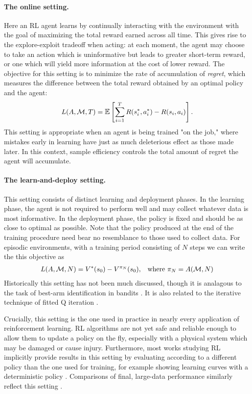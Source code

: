 \paragraph{The online setting.}
Here an RL agent learns by continually interacting with the environment with the goal of maximizing the total reward earned across all time.
This gives rise to the explore-exploit tradeoff when acting: at each moment, the agent may choose to take an action which is uninformative but leads to greater short-term reward, or one which will yield more information at the cost of lower reward.
The objective for this setting is to minimize the rate of accumulation of \emph{regret}, which measures the difference between the total reward obtained by an optimal policy and the agent:
\begin{align}
    L(A, \mdp, T) = \E \left[ \sum_{i=1}^T R(s^*_i, a^*_i) - R(s_i, a_i) \right].
\end{align}
This setting is appropriate when an agent is being trained "on the job," where mistakes early in learning have just as much deleterious effect as those made later.
In this context, sample efficiency controls the total amount of regret the agent will accumulate.

\paragraph{The learn-and-deploy setting.}
This setting consists of distinct learning and deployment phases.
In the learning phase, the agent is not required to perform well and may collect whatever data is most informative.
In the deployment phase, the policy is fixed and should be as close to optimal as possible.
Note that the policy produced at the end of the training procedure need bear no resemblance to those used to collect data.
For episodic environments, with a training period consisting of $N$ steps we can write the this objective as
\begin{align}
    L(A, \mathcal{M}, N) = V^*(s_0) - V^{\pi_N}(s_0), && \text{where } \pi_N = A(\mathcal{M}, N)
\end{align}
Historically this setting has not been much discussed, though it is analagous to the task of best-arm identification in bandits \citep{Russo2016SimpleBA,Kaufmann2016OnTC}.
It is also related to the iterative technique of fitted Q iteration \citep{Ernst2005TreeBasedBM,Riedmiller2005NeuralFQ}.

Crucially, this setting is the one used in practice in nearly every application of reinforcement learning.
RL algorithms are not yet safe and reliable enough to allow them to update a policy on the fly, especially with a physical system which may be damaged or cause injury.
Furthermore, most works studying RL implicitly provide results in this setting by evaluating according to a different policy than the one used for training, for example showing learning curves with a deterministic policy \citep{Mnih2015HumanlevelCT,Lillicrap2016ContinuousCW,Fujimoto2018AddressingFA,haarnoja2018soft}.
Comparisons of final, large-data performance similarly reflect this setting \citep{Silver2016MasteringTG,Vinyals2019GrandmasterLI,openai2019dota,OpenAI2019SolvingRC}.

